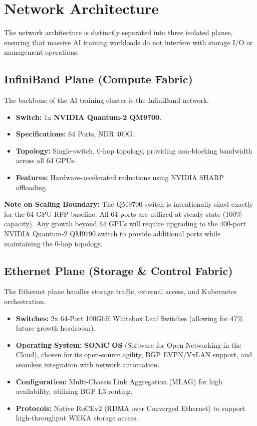 \chapter{Network Architecture}

The network architecture is distinctly separated into three isolated planes, ensuring that massive AI training workloads do not interfere with storage I/O or management operations.

\section{InfiniBand Plane (Compute Fabric)}
The backbone of the AI training cluster is the InfiniBand network.
\begin{itemize}
    \item \textbf{Switch:} 1x \textbf{NVIDIA Quantum-2 QM9700}.
    \item \textbf{Specifications:} 64 Ports, NDR 400G.
    \item \textbf{Topology:} Single-switch, 0-hop topology, providing non-blocking bandwidth across all 64 GPUs.
    \item \textbf{Features:} Hardware-accelerated reductions using NVIDIA SHARP offloading.
\end{itemize}

\textbf{Note on Scaling Boundary:} The QM9700 switch is intentionally sized exactly for the 64-GPU RFP baseline. All 64 ports are utilized at steady state (100\% capacity). Any growth beyond 64 GPUs will require upgrading to the 400-port NVIDIA Quantum-2 QM9790 switch to provide additional ports while maintaining the 0-hop topology.

\section{Ethernet Plane (Storage \& Control Fabric)}
The Ethernet plane handles storage traffic, external access, and Kubernetes orchestration.
\begin{itemize}
    \item \textbf{Switches:} 2x 64-Port 100GbE Whitebox Leaf Switches (allowing for 47\% future growth headroom).
    \item \textbf{Operating System:} \textbf{SONiC OS} (Software for Open Networking in the Cloud), chosen for its open-source agility, BGP EVPN/VxLAN support, and seamless integration with network automation.
    \item \textbf{Configuration:} Multi-Chassis Link Aggregation (MLAG) for high availability, utilizing BGP L3 routing.
    \item \textbf{Protocols:} Native RoCEv2 (RDMA over Converged Ethernet) to support high-throughput WEKA storage access.
\end{itemize}


